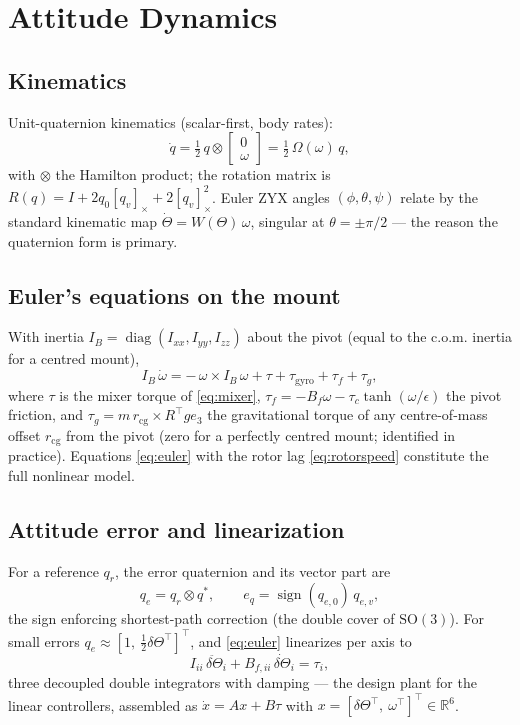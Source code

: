 \documentclass[conference]{IEEEtran}
\newcommand{\sign}{\operatorname{sign}}
\newcommand{\diag}{\operatorname{diag}}
\newcommand{\skewm}[1]{[#1]_\times}
\begin{document}
\section{Attitude Dynamics}
\subsection{Kinematics}
Unit-quaternion kinematics (scalar-first, body rates):
\begin{equation}
\dot q = \tfrac12\, q \otimes \begin{bmatrix}0\\ \omega\end{bmatrix}
= \tfrac12\,\Omega(\omega)\,q,
\end{equation}
with $\otimes$ the Hamilton product; the rotation matrix is $R(q) = I + 2q_0\skewm{q_v} + 2\skewm{q_v}^2$. Euler ZYX angles $(\phi,\theta,\psi)$ relate by the standard kinematic map $\dot\Theta = W(\Theta)\,\omega$, singular at $\theta = \pm\pi/2$ --- the reason the quaternion form is primary.

\subsection{Euler's equations on the mount}
With inertia $I_B = \diag(I_{xx}, I_{yy}, I_{zz})$ about the pivot (equal to the c.o.m. inertia for a centred mount),
\begin{equation}
I_B\,\dot\omega = -\,\omega\times I_B\,\omega + \tau + \tau_{\mathrm{gyro}} + \tau_{f} + \tau_{g},
\label{eq:euler}
\end{equation}
where $\tau$ is the mixer torque of \eqref{eq:mixer}, $\tau_f = -B_f\omega - \tau_c\tanh(\omega/\epsilon)$ the pivot friction, and $\tau_g = m\,r_{\mathrm{cg}}\times R^{\!\top}g e_3$ the gravitational torque of any centre-of-mass offset $r_{\mathrm{cg}}$ from the pivot (zero for a perfectly centred mount; identified in practice). Equations \eqref{eq:euler} with the rotor lag \eqref{eq:rotorspeed} constitute the full nonlinear model.

\subsection{Attitude error and linearization}
For a reference $q_r$, the error quaternion and its vector part are
\begin{equation}
q_e = q_r \otimes q^{*},\qquad e_q = \sign(q_{e,0})\,q_{e,v},
\label{eq:qerr}
\end{equation}
the sign enforcing shortest-path correction (the double cover of $\mathrm{SO}(3)$). For small errors $q_e \approx [1,\ \tfrac12\delta\Theta^{\!\top}]^{\!\top}$, and \eqref{eq:euler} linearizes per axis to
\begin{equation}
I_{ii}\,\ddot{\delta\Theta}_i + B_{f,ii}\,\dot{\delta\Theta}_i = \tau_i,
\end{equation}
three decoupled double integrators with damping --- the design plant for the linear controllers, assembled as $\dot x = Ax + B\tau$ with $x = [\delta\Theta^{\!\top},\ \omega^{\!\top}]^{\!\top}\in\mathbb R^6$.
\end{document}
